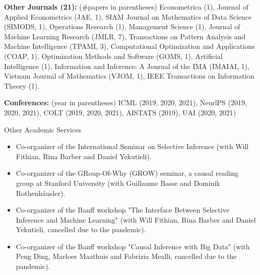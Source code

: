 \documentclass{article}
\begin{document}
\vspace{2mm}
\noindent \textbf{Other Journals (21): }(\#papers in parentheses) Econometrica (1), Journal of Applied Econometrics (JAE, 1), SIAM Journal on Mathematics of Data Science (SIMODS, 1), Operations Research (1), Management Science (1), Journal of Machine Learning Research (JMLR, 7), Transactions on Pattern Analysis and Machine Intelligence (TPAMI, 3), Computational Optimization and Applications (COAP, 1), Optimization Methods and Software (GOMS, 1), Artificial Intelligence (1), Information and Inference: A Journal of the IMA (IMAIAI, 1), Vietnam Journal of Mathematics (VJOM, 1), IEEE Transactions on Information Theory (1).

\vspace{2mm}
\noindent \textbf{Conferences: }(year in parentheses) ICML (2019, 2020, 2021), NeurlPS (2019, 2020, 2021), COLT (2019, 2020, 2021), AISTATS (2019), UAI (2020, 2021)

\vspace{5mm}
\begin{large}
\noindent Other Academic Services
\end{large}

\begin{itemize}
\item Co-organizer of the International Seminar on Selective Inference (with Will Fithian, Rina Barber and Daniel Yekutieli).
\item Co-organizer of the GRoup-Of-Why (GROW) seminar, a causal reading group at Stanford University (with Guillaume Basse and Dominik Rothenhäusler).
\item Co-organizer of the Banff workshop "The Interface Between Selective Inference and Machine Learning" (with Will Fithian, Rina Barber and Daniel Yekutieli, cancelled due to the pandemic).
\item Co-organizer of the Banff workshop "Causal Inference with Big Data" (with Peng Ding, Marloes Maathuis and Fabrizia Mealli, cancelled due to the pandemic).
\end{itemize}
\end{document}
